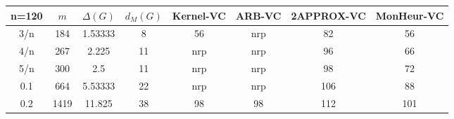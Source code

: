 \begin{tabular}{||c||ccc||cccc||}
 \hline \hline 
 n=120&$m$&$\Delta (G)$&$d_M(G)$& Kernel-VC & ARB-VC & 2APPROX-VC & MonHeur-VC\\ \hline \hline
3/n&184&1.53333&8&56& nrp&82&56\\
4/n&267&2.225&11& nrp& nrp&96&66\\
5/n&300&2.5&11& nrp& nrp&98&72\\
0.1&664&5.53333&22& nrp& nrp&106&88\\
0.2&1419&11.825&38&98&98&112&101\\
\hline \end{tabular}

